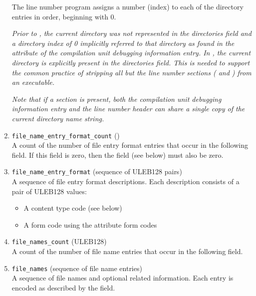 \begin{enumerate}[1. ]
The line number program assigns a number (index) to each
of the directory entries in order, beginning with 0.
   
\textit{Prior to \DWARFVersionV, the current directory was not
represented in the directories field and a directory index
of 0 implicitly referred to that directory as found in the
\DWATcompdir{} attribute of the compilation unit 
debugging information entry. 
In \DWARFVersionV, the current directory is explicitly present
in the directories field. This is needed to support the
common practice of stripping all but the line number sections
(\dotdebugline{} and \dotdebuglinestr) from an executable.}

\textit{Note that if a \dotdebuglinestr{} section is present, 
both the compilation unit debugging information entry 
and the line number header can
share a single copy of the current directory name string.}

\item \texttt{file\_name\_entry\_format\_count} (\HFTubyte) \\
A count of the number of file entry format entries that
occur in the following  field. 
If this field is zero, then the  field 
(see below) must also be zero.

\item \texttt{file\_name\_entry\_format} (sequence of ULEB128 pairs) \\
A sequence of file entry format descriptions.
Each description consists of a pair of ULEB128 values:
\begin{itemize}
\setlength{\itemsep}{0em}
\item A content type code (see below)
\item A form code using the attribute form codes
\end{itemize}

\item \texttt{file\_names\_count} (ULEB128) \\
A count of the number of file name entries that occur
in the following  field.

\item \texttt{file\_names} (sequence of file name entries) \\
A sequence of file names and optional related
information. Each entry is encoded as described
by the  field.
  

\end{enumerate}
